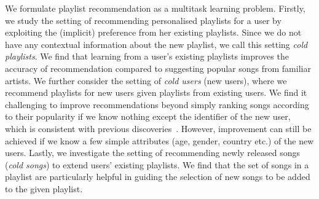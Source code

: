 
We formulate playlist recommendation as a multitask learning problem.
Firstly, we study the setting of recommending %
personalised playlists for a user
by exploiting the (implicit) preference %
from her existing playlists.
Since we do not have any contextual information about the new playlist, 
we call this setting \emph{cold playlists}.
We find that learning from a user's existing playlists %
improves the accuracy of recommendation compared to 
suggesting popular songs from familiar artists.
%
We further consider the setting of \emph{cold users} (\ie new users),
where we recommend playlists for new users %
given playlists from existing users.
We find it challenging to improve recommendations beyond simply ranking songs according to their popularity 
if we know nothing except the identifier of the new user, %
which is consistent with previous 
discoveries~\cite{mcfee2012million,bonnin2013evaluating,bonnin2015automated}.
However, improvement can still be achieved if we know a few simple attributes (\eg age, gender, country etc.)
of the new users.
%
%
%
Lastly, we investigate the setting of recommending newly released songs (\ie \emph{cold songs}) 
to extend users' existing playlists. 
We find that the set of songs in a playlist are particularly %
helpful in guiding %
the selection of new songs to be added to the given playlist.

